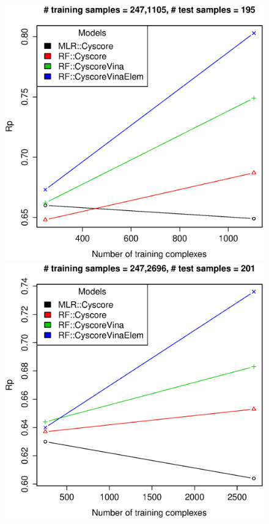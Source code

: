 \documentclass[journal=jacsat,manuscript=article]{achemso}
\begin{document}
\begin{figure}[ht!]
\includegraphics[width=\linewidth]{../rfcyscore/tst-195-pcor.eps}
\endminipage
{}
\includegraphics[width=\linewidth]{../rfcyscore/tst-201-pcor.eps}
\endminipage
{}

\end{figure}
\end{document}
